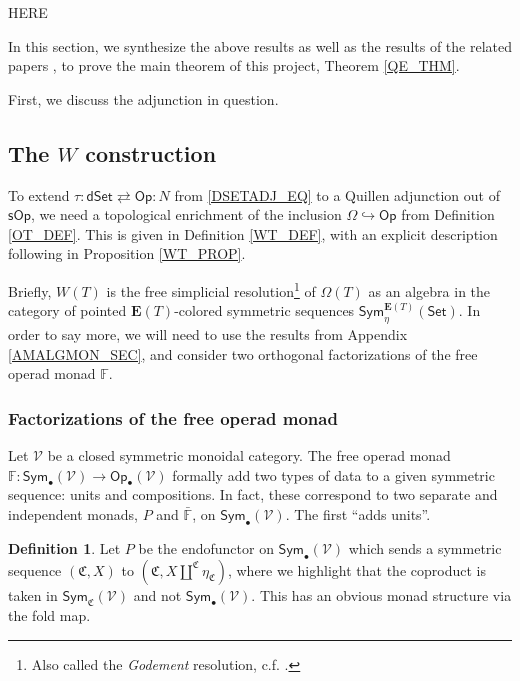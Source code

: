 \documentclass[a4paper,10pt
,draft
]{article}%
\numberwithin{equation}{section}
\numberwithin{figure}{section}
\theoremstyle{definition} %
\newtheorem{definition}[equation]{Definition}%
\newcommand{\into}{\hookrightarrow}%
\newcommand{\Sym}{\ensuremath{\mathsf{Sym}}}%
\newcommand{\Set}{\ensuremath{\mathsf{Set}}}
\newcommand{\Op}{\mathsf{Op}}%
\newcommand{\sOp}{\ensuremath{\mathsf{sOp}}}%
\newcommand{\dSet}{\mathsf{dSet}}
\newcommand{\V}{\ensuremath{\mathcal V}}
\newcommand{\1}{\ensuremath{\mathbbm 1}}%
\begin{document}
{\color{red} HERE}	

In this section, we synthesize the above results as well as the results of the related papers \cite{BP_geo,BP_edss,Per18},
to prove the main theorem of this project, Theorem \ref{QE_THM}.

First, we discuss the adjunction in question.

\subsection{The $W$ construction}

To extend $\tau \colon \dSet \rightleftarrows \Op \colon N$ from \eqref{DSETADJ_EQ} to a Quillen adjunction out of $\sOp$,
we need a topological enrichment of the inclusion $\Omega \into \Op$ from Definition \ref{OT_DEF}.
This is given in Definition \ref{WT_DEF}, with an explicit description following in Proposition \ref{WT_PROP}.

Briefly, $W(T)$ is the free simplicial resolution\footnote{Also called the \textit{Godement} resolution, c.f. \cite[\S 8.3]{BM06}.}
of $\Omega(T)$ as an algebra in the category of pointed $\mathbf E(T)$-colored symmetric sequences $\Sym^{\mathbf E(T)}_{\eta}(\Set)$.
In order to say more, we will need to use the results from Appendix \ref{AMALGMON_SEC}, and consider
two orthogonal factorizations of the free operad monad $\mathbb F$.

\subsubsection{Factorizations of the free operad monad}

Let $\V$ be a closed symmetric monoidal category.
The free operad monad $\mathbb F \colon \Sym_\bullet(\V) \to \Op_\bullet(\V)$ formally add two types of data to a given symmetric sequence:
units and compositions.
In fact, these correspond to two separate and independent monads, $P$ and $\bar{\mathbb F}$, on $\Sym_\bullet(\V)$.
The first ``adds units''.
\begin{definition}
      Let $P$ be the endofunctor on $\Sym_{\bullet}(\V)$
      which sends a symmetric sequence $(\mathfrak C, X)$ to $(\mathfrak C, X \amalg^{\mathfrak C} \eta_{\mathfrak C})$,
      where we highlight that the coproduct is taken in $\Sym_{\mathfrak C}(\V)$ and not $\Sym_{\bullet}(\V)$.
      This has an obvious monad structure via the fold map.      
\end{definition}
\end{document}
